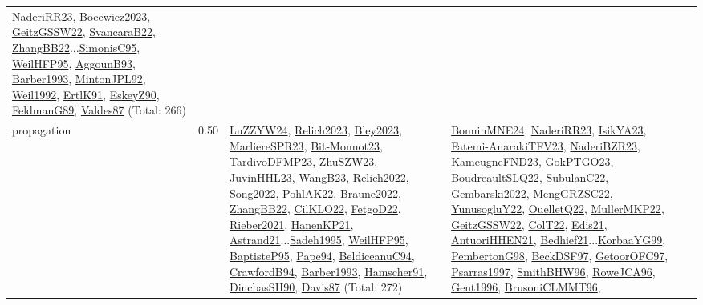 {\begin{longtable}{p{3cm}r>{\raggedright\arraybackslash}p{6cm}>{\raggedright\arraybackslash}p{6cm}>{\raggedright\arraybackslash}p{8cm}}
\hyperref[detail:NaderiRR23]{NaderiRR23}, \hyperref[detail:Bocewicz2023]{Bocewicz2023}, \hyperref[detail:GeitzGSSW22]{GeitzGSSW22}, \hyperref[detail:SvancaraB22]{SvancaraB22}, \hyperref[detail:ZhangBB22]{ZhangBB22}...\hyperref[detail:SimonisC95]{SimonisC95}, \hyperref[detail:WeilHFP95]{WeilHFP95}, \hyperref[detail:AggounB93]{AggounB93}, \hyperref[detail:Barber1993]{Barber1993}, \hyperref[detail:MintonJPL92]{MintonJPL92}, \hyperref[detail:Weil1992]{Weil1992}, \hyperref[detail:ErtlK91]{ErtlK91}, \hyperref[detail:EskeyZ90]{EskeyZ90}, \hyperref[detail:FeldmanG89]{FeldmanG89}, \hyperref[detail:Valdes87]{Valdes87} (Total: 266)\\
\index{propagation}\index{CP!propagation}propagation &  0.50 & \hyperref[detail:LuZZYW24]{LuZZYW24}, \hyperref[detail:Relich2023]{Relich2023}, \hyperref[detail:Bley2023]{Bley2023}, \hyperref[detail:MarliereSPR23]{MarliereSPR23}, \hyperref[detail:Bit-Monnot23]{Bit-Monnot23}, \hyperref[detail:TardivoDFMP23]{TardivoDFMP23}, \hyperref[detail:ZhuSZW23]{ZhuSZW23}, \hyperref[detail:JuvinHHL23]{JuvinHHL23}, \hyperref[detail:WangB23]{WangB23}, \hyperref[detail:Relich2022]{Relich2022}, \hyperref[detail:Song2022]{Song2022}, \hyperref[detail:PohlAK22]{PohlAK22}, \hyperref[detail:Braune2022]{Braune2022}, \hyperref[detail:ZhangBB22]{ZhangBB22}, \hyperref[detail:CilKLO22]{CilKLO22}, \hyperref[detail:FetgoD22]{FetgoD22}, \hyperref[detail:Rieber2021]{Rieber2021}, \hyperref[detail:HanenKP21]{HanenKP21}, \hyperref[detail:Astrand21]{Astrand21}...\hyperref[detail:Sadeh1995]{Sadeh1995}, \hyperref[detail:WeilHFP95]{WeilHFP95}, \hyperref[detail:BaptisteP95]{BaptisteP95}, \hyperref[detail:Pape94]{Pape94}, \hyperref[detail:BeldiceanuC94]{BeldiceanuC94}, \hyperref[detail:CrawfordB94]{CrawfordB94}, \hyperref[detail:Barber1993]{Barber1993}, \hyperref[detail:Hamscher91]{Hamscher91}, \hyperref[detail:DincbasSH90]{DincbasSH90}, \hyperref[detail:Davis87]{Davis87} (Total: 272) & \hyperref[detail:BonninMNE24]{BonninMNE24}, \hyperref[detail:NaderiRR23]{NaderiRR23}, \hyperref[detail:IsikYA23]{IsikYA23}, \hyperref[detail:Fatemi-AnarakiTFV23]{Fatemi-AnarakiTFV23}, \hyperref[detail:NaderiBZR23]{NaderiBZR23}, \hyperref[detail:KameugneFND23]{KameugneFND23}, \hyperref[detail:GokPTGO23]{GokPTGO23}, \hyperref[detail:BoudreaultSLQ22]{BoudreaultSLQ22}, \hyperref[detail:SubulanC22]{SubulanC22}, \hyperref[detail:Gembarski2022]{Gembarski2022}, \hyperref[detail:MengGRZSC22]{MengGRZSC22}, \hyperref[detail:YunusogluY22]{YunusogluY22}, \hyperref[detail:OuelletQ22]{OuelletQ22}, \hyperref[detail:MullerMKP22]{MullerMKP22}, \hyperref[detail:GeitzGSSW22]{GeitzGSSW22}, \hyperref[detail:ColT22]{ColT22}, \hyperref[detail:Edis21]{Edis21}, \hyperref[detail:AntuoriHHEN21]{AntuoriHHEN21}, \hyperref[detail:Bedhief21]{Bedhief21}...\hyperref[detail:KorbaaYG99]{KorbaaYG99}, \hyperref[detail:PembertonG98]{PembertonG98}, \hyperref[detail:BeckDSF97]{BeckDSF97}, \hyperref[detail:GetoorOFC97]{GetoorOFC97}, \hyperref[detail:Psarras1997]{Psarras1997}, \hyperref[detail:SmithBHW96]{SmithBHW96}, \hyperref[detail:RoweJCA96]{RoweJCA96}, \hyperref[detail:Gent1996]{Gent1996}, \hyperref[detail:BrusoniCLMMT96]{BrusoniCLMMT96}, 
\end{longtable}}
